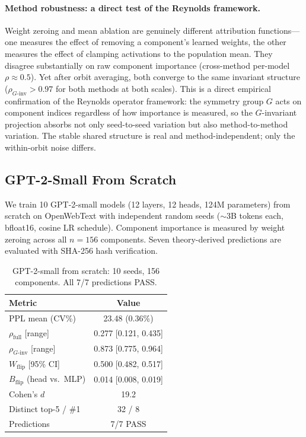 \documentclass{jmlr}
\begin{document}
\paragraph{Method robustness: a direct test of the Reynolds framework.}
Weight zeroing and mean ablation are genuinely different attribution functions---one measures the effect of removing a component's learned weights, the other measures the effect of clamping activations to the population mean. They disagree substantially on raw component importance (cross-method per-model $\rho \approx 0.5$). Yet after orbit averaging, both converge to the same invariant structure ($\rho_{G\text{-inv}} > 0.97$ for both methods at both scales). This is a direct empirical confirmation of the Reynolds operator framework: the symmetry group $G$ acts on component indices regardless of how importance is measured, so the $G$-invariant projection absorbs not only seed-to-seed variation but also method-to-method variation. The stable shared structure is real and method-independent; only the within-orbit noise differs.

\subsection{GPT-2-Small From Scratch}
\label{sec:gpt2}

We train 10 GPT-2-small models (12 layers, 12 heads, 124M parameters) from scratch on OpenWebText with independent random seeds (${\sim}3$B tokens each, bfloat16, cosine LR schedule). Component importance is measured by weight zeroing across all $n{=}156$ components. Seven theory-derived predictions are evaluated with SHA-256 hash verification.

\begin{table}[ht]
\centering
\caption{GPT-2-small from scratch: 10 seeds, 156 components. All 7/7 predictions PASS.}
\label{tab:gpt2}
\small
\begin{tabular}{lc}
\toprule
\textbf{Metric} & \textbf{Value} \\
\midrule
PPL mean (CV\%) & 23.48 (0.36\%) \\
$\rho_{\text{full}}$ [range] & 0.277 [0.121, 0.435] \\
$\rho_{G\text{-inv}}$ [range] & 0.873 [0.775, 0.964] \\
$W_{\text{flip}}$ [95\% CI] & 0.500 [0.482, 0.517] \\
$B_{\text{flip}}$ (head vs.\ MLP) & 0.014 [0.008, 0.019] \\
Cohen's $d$ & 19.2 \\
Distinct top-5 / \#1 & 32 / 8 \\
Predictions & 7/7 PASS \\
\bottomrule
\end{tabular}
\end{table}
\end{document}
